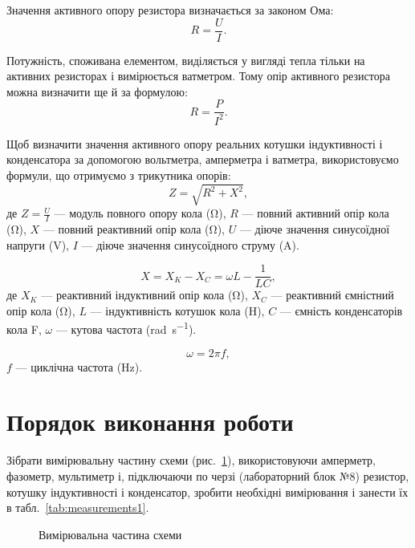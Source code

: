 \documentclass[a4paper,oneside,DIV=12,12pt]{scrartcl}
\begin{document}
		Значення активного опору резистора визначається за законом Ома:
		\[
			R = \frac{U}{I}.
		\]
		
		Потужність, споживана елементом, виділяється у вигляді тепла тільки на активних резисторах і вимірюється ватметром. Тому опір активного резистора можна визначити ще й за формулою:
		\[
			R = \frac{P}{I^2}.
		\]
		
		Щоб визначити значення активного опору реальних котушки індуктивності і конденсатора за допомогою вольтметра, амперметра і ватметра, використовуємо формули, що отримуємо з трикутника опорів:
		\[
			Z = \sqrt{R^2 + X^2},
		\]
		де $Z = \frac{U}{I}$ --- модуль повного опору кола (\si{\ohm}), $R$ --- повний активний опір кола (\si{\ohm}), $X$ --- повний реактивний опір кола (\si{\ohm}), $U$ --- діюче значення синусоїдної напруги (\si{\volt}), $I$ --- діюче значення синусоїдного струму (\si{\ampere}).
		
		\[
			X = X_K - X_C = \omega L - \frac{1}{LC},
		\]
		де $X_K$ --- реактивний індуктивний опір кола (\si{\ohm}), $X_C$ --- реактивний ємністний опір кола (\si{\ohm}), $L$ --- індуктивність котушок кола (\si{\henry}), $C$ --- ємність конденсаторів кола {\si{\farad}}, $\omega$ --- кутова частота (\si{\radian\per\second}).
		
		\[
			\omega = 2 \pi f,
		\]
		$f$ --- циклічна частота (\si{\hertz}).
		
	\section{Порядок виконання роботи}
		Зібрати вимірювальну частину схеми (рис.~\ref{fig:schematic}), використовуючи амперметр, фазометр, мультиметр і, підключаючи по черзі (лабораторний блок №8) резистор, котушку індуктивності і конденсатор, зробити необхідні вимірювання і занести їх в табл.~\ref{tab:measurements1}. 
		
		\begin{figure}[!htbp]
			\caption{Вимірювальна частина схеми}
			\label{fig:schematic}
		\end{figure}
		
\end{document}
